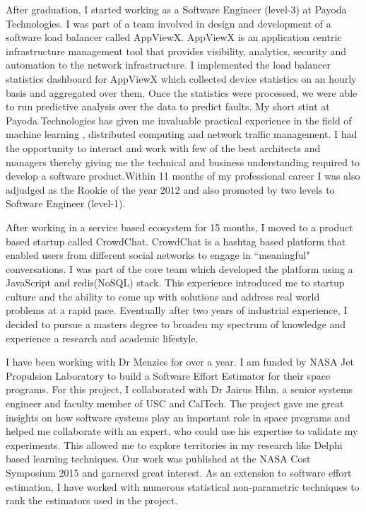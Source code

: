 \documentclass{article}
\begin{document}
\bigskip

After graduation, I started working as a Software Engineer (level-3) at Payoda Technologies. I was part of a team involved in design and development of a software load balancer called AppViewX. AppViewX is an application centric infrastructure management tool that provides visibility, analytics, security and automation to the network infrastructure. I implemented the load balancer statistics dashboard for AppViewX which collected device statistics on an hourly basis and aggregated over them. Once the statistics were processed, we were able to run predictive analysis over the data to predict faults. My short stint at Payoda Technologies has given me invaluable practical experience in the field of machine learning , 
distributed computing and network traffic management. I had the opportunity to interact and 
work with few of the best architects and managers thereby giving me the technical and business
understanding required to develop a software product.Within 11 months of my professional career I was also adjudged as the Rookie of the year 2012 and also promoted by two levels to Software Engineer (level-1). 

\bigskip
After working in a service based ecosystem for 15 months, I moved to a product based startup called CrowdChat. CrowdChat is a hashtag based platform that enabled users from different social networks to engage in ``meaningful" conversations. I was part of the  core team which developed the platform using a JavaScript and redis(NoSQL) stack. This experience introduced me to startup culture and the ability to come up with solutions and address real world problems at a rapid pace. Eventually after two years of industrial experience, I decided to pursue a masters degree to broaden my spectrum of knowledge and experience a research and academic lifestyle.


\bigskip
I have been working with Dr Menzies for over a year. I am funded by NASA Jet Propulsion Laboratory to build a Software Effort Estimator for their space programs. For this project, I collaborated with Dr Jairus Hihn, a senior systems engineer and faculty member of USC and CalTech. The project gave me great insights on how software systems play an important role in space programs and helped me collaborate with an expert, who could use his expertise to validate my experiments. This allowed me to explore territories in my research like Delphi based learning techniques. Our work was published at the NASA Cost Symposium 2015 and garnered great interest. As an extension to software effort estimation, I have worked with numerous statistical non-parametric techniques to rank the estimators used in the project.
\end{document}
